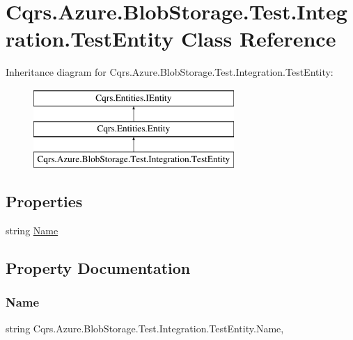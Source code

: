 \hypertarget{classCqrs_1_1Azure_1_1BlobStorage_1_1Test_1_1Integration_1_1TestEntity}{}\section{Cqrs.\+Azure.\+Blob\+Storage.\+Test.\+Integration.\+Test\+Entity Class Reference}
\label{classCqrs_1_1Azure_1_1BlobStorage_1_1Test_1_1Integration_1_1TestEntity}
Inheritance diagram for Cqrs.\+Azure.\+Blob\+Storage.\+Test.\+Integration.\+Test\+Entity\+:\begin{figure}[H]
\begin{center}
\leavevmode
\includegraphics[height=3.000000cm]{classCqrs_1_1Azure_1_1BlobStorage_1_1Test_1_1Integration_1_1TestEntity}
\end{center}
\end{figure}
\subsection*{Properties}
\begin{DoxyCompactItemize}
\item 
string \hyperlink{classCqrs_1_1Azure_1_1BlobStorage_1_1Test_1_1Integration_1_1TestEntity_aad584f6a6399f936b17e6367ebf30b3d_aad584f6a6399f936b17e6367ebf30b3d}{Name}
\end{DoxyCompactItemize}


\subsection{Property Documentation}
\mbox{\label{classCqrs_1_1Azure_1_1BlobStorage_1_1Test_1_1Integration_1_1TestEntity_aad584f6a6399f936b17e6367ebf30b3d_aad584f6a6399f936b17e6367ebf30b3d}} 
\subsubsection{\texorpdfstring{Name}{Name}}
{\footnotesize\ttfamily string Cqrs.\+Azure.\+Blob\+Storage.\+Test.\+Integration.\+Test\+Entity.\+Name\hspace{0.3cm}{\ttfamily [get]}, {\ttfamily [set]}}

